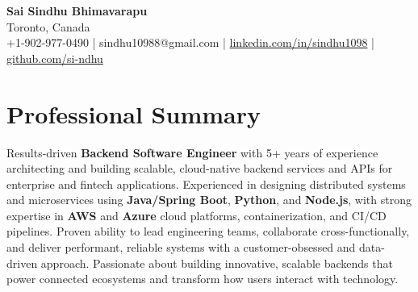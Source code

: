 \documentclass[letterpaper,11pt]{article}
\begin{document}
\begin{center}
  {\Large \textbf{Sai Sindhu Bhimavarapu}} \\
  Toronto, Canada \\
  +1-902-977-0490 \enspace | \enspace sindhu10988@gmail.com \enspace | \enspace \href{https://www.linkedin.com/in/sindhu1098/}{linkedin.com/in/sindhu1098} \enspace | \enspace \href{https://github.com/si-ndhu}{github.com/si-ndhu}
\end{center}

\section{Professional Summary}
  \begin{itemize}[leftmargin=0.15in, label={}]
    \small{\item{
     Results-driven \textbf{Backend Software Engineer} with 5+ years of experience architecting and building scalable, cloud-native backend services and APIs for enterprise and fintech applications. Experienced in designing distributed systems and microservices using \textbf{Java/Spring Boot}, \textbf{Python}, and \textbf{Node.js}, with strong expertise in \textbf{AWS} and \textbf{Azure} cloud platforms, containerization, and CI/CD pipelines. Proven ability to lead engineering teams, collaborate cross-functionally, and deliver performant, reliable systems with a customer-obsessed and data-driven approach. Passionate about building innovative, scalable backends that power connected ecosystems and transform how users interact with technology.
    }}
  \end{itemize}
\vspace{-16pt}

\end{document}
